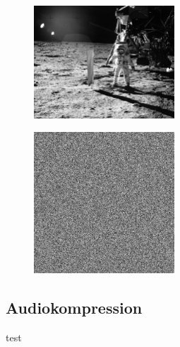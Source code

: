 \documentclass[xcolor=dvipsnames,presentation]{beamer}    %
\newenvironment{witemize}{\itemize\setlength{\itemsep}{1em}}{\enditemize}
\begin{document}
\begin{frame}{\insertsubsection}
\begin{figure}[T]
  \centering
  \includegraphics[width=0.470\textwidth]{bilder/moon.jpg}
  \hfill
\end{figure}
\end{frame}

\begin{frame}{\insertsubsection}
\begin{figure}[T]
  \centering
  \includegraphics[width=0.470\textwidth]{bilder/uniformnoise.png}
  \hfill
\end{figure}
\end{frame}

\subsection{Audiokompression}
\begin{frame}[<+->]{\insertsection}
\begin{witemize}
\item test
\end{witemize}
\end{frame}
\end{document}
